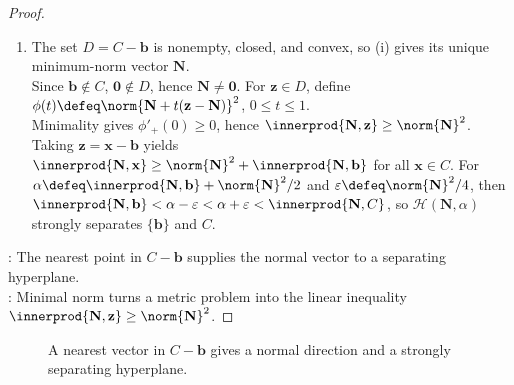 \begin{theorem}
\begin{proof}
\begin{enumerate}[label=(\roman*)]
\item The set $D=C-\mathbf{b}$ is nonempty, closed, and convex, so (i) gives its unique minimum-norm vector $\mathbf{N}$.\\
Since $\mathbf{b}\notin C$, $\mathbf{0}\notin D$, hence $\mathbf{N}\neq\mathbf{0}$. For $\mathbf{z}\in D$, define $\phi(t)\defeq\norm{\mathbf{N}+t(\mathbf{z}-\mathbf{N})}^2$, $0\leq t\leq1$.\\
Minimality gives $\phi'_+(0)\geq0$, hence $\innerprod{\mathbf{N},\mathbf{z}}\geq\norm{\mathbf{N}}^2$. Taking $\mathbf{z}=\mathbf{x}-\mathbf{b}$ yields $\innerprod{\mathbf{N},\mathbf{x}}\geq\norm{\mathbf{N}}^2+\innerprod{\mathbf{N},\mathbf{b}}$ for all $\mathbf{x}\in C$. For $\alpha\defeq\innerprod{\mathbf{N},\mathbf{b}}+\norm{\mathbf{N}}^2/2$ and $\varepsilon\defeq\norm{\mathbf{N}}^2/4$, then $\innerprod{\mathbf{N},\mathbf{b}} <\alpha-\varepsilon<\alpha+\varepsilon<\innerprod{\mathbf{N},C}$, so $\mathcal{H}(\mathbf{N},\alpha)$ strongly separates $\{\mathbf{b}\}$ and $C$.
\end{enumerate}
: The nearest point in $C-\mathbf{b}$ supplies the normal vector to a separating hyperplane.\\
: Minimal norm turns a metric problem into the linear inequality $\innerprod{\mathbf{N},\mathbf{z}}\geq\norm{\mathbf{N}}^2$.
\end{proof}
\end{theorem}


\begin{figure}[H]
  \centering
  
  \caption{A nearest vector in $C-\mathbf{b}$ gives a normal direction and a strongly separating hyperplane.}
  \label{fig:convex-point-separating-hyperplane}
\end{figure}

